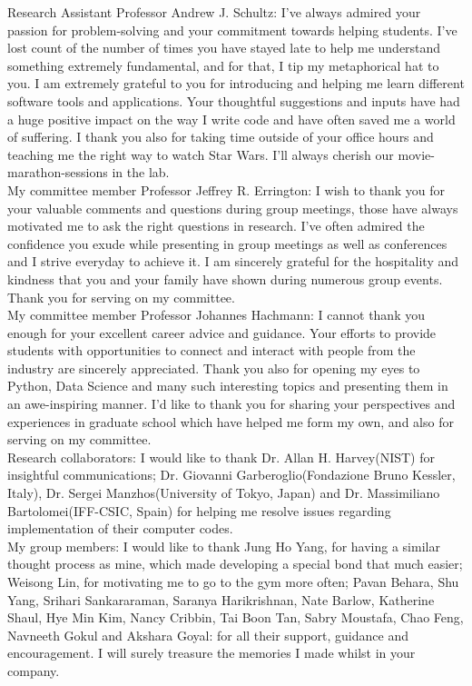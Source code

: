 \noindent Research Assistant Professor Andrew J. Schultz: I've always admired your passion for problem-solving and your commitment towards helping students. I've lost count of the number of times you have stayed late to help me understand something extremely fundamental, and for that, I tip my metaphorical hat to you. I am extremely grateful to you for introducing and helping me learn different software tools and applications. Your thoughtful suggestions and inputs have had a huge positive impact on the way I write code and have often saved me a world of suffering. I thank you also for taking time outside of your office hours and teaching me the right way to watch Star Wars. I'll always cherish our movie-marathon-sessions in the lab.\\

\noindent My committee member Professor Jeffrey R. Errington: I wish to thank you for your valuable comments and questions during group meetings, those have always motivated me to ask the right questions in research. I've often admired the confidence you exude while presenting in group meetings as well as conferences and I strive everyday to achieve it. I am sincerely grateful for the hospitality and kindness that you and your family have shown during numerous group events.  Thank you for serving on my committee.\\

\noindent My committee member Professor Johannes Hachmann: I cannot thank you enough for your excellent career advice and guidance. Your efforts to provide students with opportunities to connect and interact with people from the industry are sincerely appreciated. Thank you also for opening my eyes to Python, Data Science and many such interesting topics and presenting them in an awe-inspiring manner. I'd like to thank you for sharing your perspectives and experiences in graduate school which have helped me form my own, and also for serving on my committee.\\

\noindent Research collaborators: I would like to thank Dr. Allan H. Harvey(NIST) for insightful communications; Dr. Giovanni Garberoglio(Fondazione Bruno Kessler, Italy), Dr. Sergei Manzhos(University of Tokyo, Japan) and Dr. Massimiliano Bartolomei(IFF-CSIC, Spain) for helping me resolve issues regarding implementation of their computer codes.\\

\noindent My group members: I would like to thank Jung Ho Yang, for having a similar thought process as mine, which made developing a special bond that much easier; Weisong Lin, for motivating me to go to the gym more often; Pavan Behara, Shu Yang, Srihari Sankararaman, Saranya Harikrishnan, Nate Barlow, Katherine Shaul, Hye Min Kim, Nancy Cribbin, Tai Boon Tan, Sabry Moustafa, Chao Feng, Navneeth Gokul and Akshara Goyal: for all their support, guidance and encouragement. I will surely treasure the memories I made whilst in your company.\\

